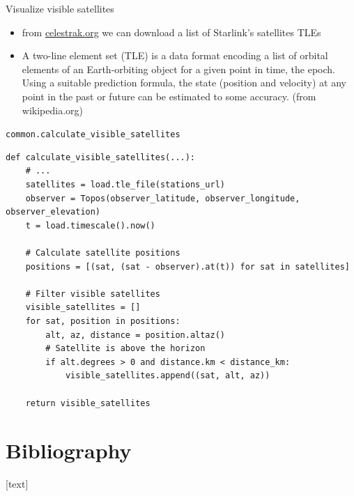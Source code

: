\documentclass[NET,english,beameralt]{tumbeamer}
\begin{document}
\begin{frame}{Visualize visible satellites}
    \begin{itemize}
        \item from \href{celestrak.org}{celestrak.org} we can download a list of Starlink's satellites TLEs
        \item A two-line element set (TLE) is a data format encoding a list of orbital elements of an Earth-orbiting object for a given point in time, the epoch. Using a suitable prediction formula, the state (position and velocity) at any point in the past or future can be estimated to some accuracy. (from wikipedia.org)
    \end{itemize}
\end{frame}

\begin{frame}[fragile]{\texttt{common.calculate\_visible\_satellites}}
    \begin{verbatim}
def calculate_visible_satellites(...):
    # ...
    satellites = load.tle_file(stations_url)
    observer = Topos(observer_latitude, observer_longitude, observer_elevation)
    t = load.timescale().now()

    # Calculate satellite positions
    positions = [(sat, (sat - observer).at(t)) for sat in satellites]
    
    # Filter visible satellites
    visible_satellites = []
    for sat, position in positions:
        alt, az, distance = position.altaz()
        # Satellite is above the horizon
        if alt.degrees > 0 and distance.km < distance_km:
            visible_satellites.append((sat, alt, az))

    return visible_satellites
    \end{verbatim}
\end{frame}

\section{Bibliography}
\begin{frame}[allowframebreaks]
    
    [text]
    \footnotesize
    
\end{frame}
\end{document}
